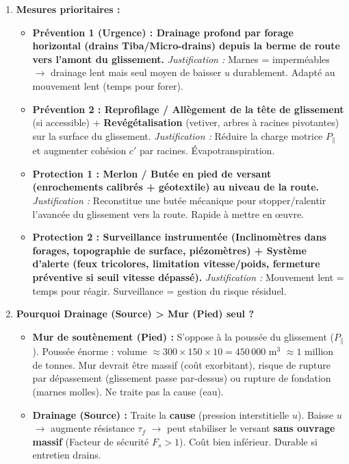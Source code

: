 \documentclass[11pt]{article}
\begin{document}
\begin{exoresolu}
\begin{enumerate}
\begin{itemize}
                \item \textbf{Risque : \textbf{TRÈS FORT}.} Aléa actif + Enjeux vitaux + Vulnérabilité route non protégée. Urgence absolue.
            \end{itemize}
        \item \textbf{Mesures prioritaires :}
            \begin{itemize}
                \item \textbf{Prévention 1 (Urgence) : Drainage profond par forage horizontal (drains Tiba/Micro-drains) depuis la berme de route vers l'amont du glissement.} \textit{Justification :} Marnes = imperméables $\rightarrow$ drainage lent mais seul moyen de baisser $u$ durablement. Adapté au mouvement lent (temps pour forer).
                \item \textbf{Prévention 2 : Reprofilage / Allègement de la tête de glissement} (si accessible) + \textbf{Revégétalisation} (vetiver, arbres à racines pivotantes) sur la surface du glissement. \textit{Justification :} Réduire la charge motrice $P_{\parallel}$ et augmenter cohésion $c'$ par racines. Évapotranspiration.
                \item \textbf{Protection 1 : Merlon / Butée en pied de versant (enrochements calibrés + géotextile) au niveau de la route.} \textit{Justification :} Reconstitue une butée mécanique pour stopper/ralentir l'avancée du glissement vers la route. Rapide à mettre en œuvre.
                \item \textbf{Protection 2 : Surveillance instrumentée (Inclinomètres dans forages, topographie de surface, piézomètres) + Système d'alerte (feux tricolores, limitation vitesse/poids, fermeture préventive si seuil vitesse dépassé).} \textit{Justification :} Mouvement lent = temps pour réagir. Surveillance = gestion du risque résiduel.
            \end{itemize}
        \item \textbf{Pourquoi Drainage (Source) > Mur (Pied) seul ?}
            \begin{itemize}
                \item \textbf{Mur de soutènement (Pied) :} S'oppose à la poussée du glissement ($P_{\parallel}$). Poussée énorme : volume $\approx 300 \times 150 \times 10 = 450\,000$ m$^3$ $\approx 1$ million de tonnes. Mur devrait être massif (coût exorbitant), risque de rupture par dépassement (glissement passe par-dessus) ou rupture de fondation (marnes molles). Ne traite pas la cause (eau).
                \item \textbf{Drainage (Source) :} Traite la \textbf{cause} (pression interstitielle $u$). Baisse $u$ $\rightarrow$ augmente résistance $\tau_f$ $\rightarrow$ peut stabiliser le versant \textbf{sans ouvrage massif} (Facteur de sécurité $F_s > 1$). Coût bien inférieur. Durable si entretien drains.

\end{itemize}
\end{enumerate}
\end{exoresolu}
\end{document}
